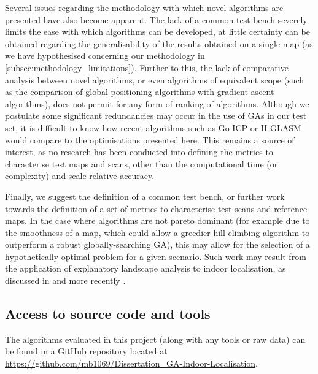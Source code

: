 \documentclass[authoryearcitations]{UoYCSproject}
\begin{document}
Several issues regarding the methodology with which novel algorithms are presented have also become apparent. The lack of a common test bench severely limits the ease with which algorithms can be developed, at little certainty can be obtained regarding the generalisability of the results obtained on a single map (as we have hypothesised concerning our methodology in \autoref{subsec:methodology_limitations}). Further to this, the lack of comparative analysis between novel algorithms, or even algorithms of equivalent scope (such as the comparison of global positioning algorithms with gradient ascent algorithms), does not permit for any form of ranking of algorithms. Although we postulate some significant redundancies may occur in the use of GAs in our test set, it is difficult to know how recent algorithms such as Go-ICP \cite{Yang2013-gx} or H-GLASM \cite{Lenac2011-co} would compare to the optimisations presented here. This remains a source of interest, as no  research has been conducted into defining the metrics to characterise test maps and scans, other than the computational time (or complexity) and scale-relative accuracy. \newline

Finally, we suggest the definition of a common test bench, or further work towards the definition of a set of metrics to characterise test scans and reference maps. In the case where algorithms are not pareto dominant (for example due to the smoothness of a map, which could allow a greedier hill climbing algorithm to outperform a robust globally-searching GA), this may allow for the selection of a hypothetically optimal problem for a given scenario. Such work may result from the application of explanatory landscape analysis to indoor localisation, as discussed in \citet{Mitchell1992-fl} and more recently \citet{Mersmann2011-jm}. \newline


\clearpage


\clearpage

\begin{appendices}
	\chapter{Access to source code and tools}
	The algorithms evaluated in this project (along with any tools or raw data) can be found in a GitHub repository located at \url{https://github.com/mb1069/Dissertation_GA-Indoor-Localisation}.
\end{appendices}
\end{document}

